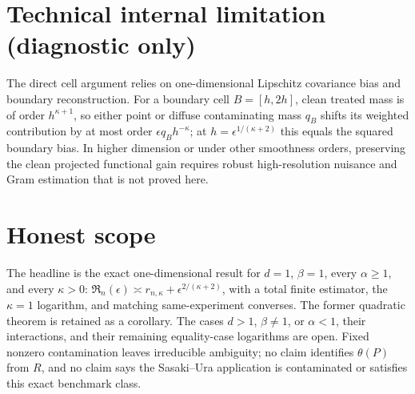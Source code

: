 \documentclass{article}
\begin{document}
\section*{Technical internal limitation (diagnostic only)}

The direct cell argument relies on one-dimensional Lipschitz covariance bias and boundary reconstruction. For a boundary cell \(B=[h,2h]\), clean treated mass is of order \(h^{\kappa+1}\), so either point or diffuse contaminating mass \(q_B\) shifts its weighted contribution by at most order \(\epsilon q_Bh^{-\kappa}\); at \(h=\epsilon^{1/(\kappa+2)}\) this equals the squared boundary bias. In higher dimension or under other smoothness orders, preserving the clean projected functional gain requires robust high-resolution nuisance and Gram estimation that is not proved here.

\section{Honest scope}

The headline is the exact one-dimensional result for \(d=1\), \(\beta=1\), every \(\alpha\geq1\), and every \(\kappa>0\): \(\mathfrak R_n(\epsilon)\asymp r_{n,\kappa}+\epsilon^{2/(\kappa+2)}\), with a total finite estimator, the \(\kappa=1\) logarithm, and matching same-experiment converses. The former quadratic theorem is retained as a corollary. The cases \(d>1\), \(\beta\neq1\), or \(\alpha<1\), their interactions, and their remaining equality-case logarithms are open. Fixed nonzero contamination leaves irreducible ambiguity; no claim identifies \(\theta(P)\) from \(R\), and no claim says the Sasaki--Ura application is contaminated or satisfies this exact benchmark class.
\end{document}
